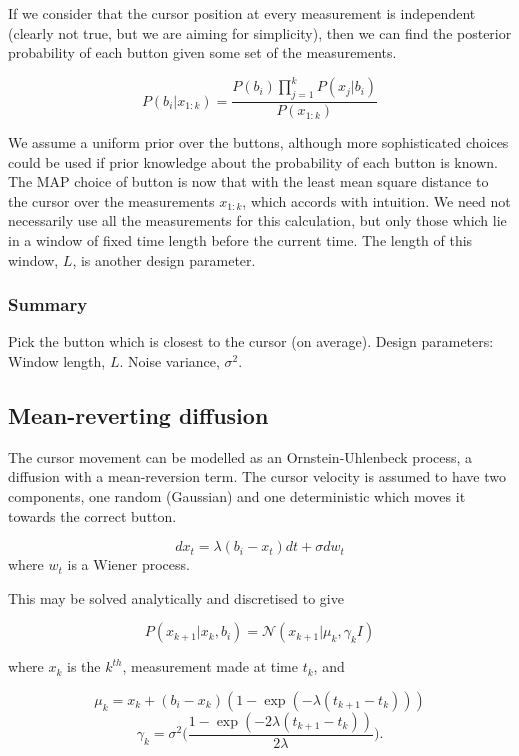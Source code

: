 If we consider that the cursor position at every measurement is independent (clearly not true, but we are aiming for simplicity), then we can find the posterior probability of each button given some set of the measurements.

\begin{equation}
P(b_i|x_{1:k}) = \frac{P(b_i)\prod_{j=1}^{k}{P(x_j| b_i)}}{P(x_{1:k})}
\end{equation}

We assume a uniform prior over the buttons, although more sophisticated choices could be used if prior knowledge about the probability of each button is known. The MAP choice of button is now that with the least mean square distance to the cursor over the measurements $x_{1:k}$, which accords with intuition. We need not necessarily use all the measurements for this calculation, but only those which lie in a window of fixed time length before the current time. The length of this window, $L$, is another design parameter.

\subsubsection*{Summary}
Pick the button which is closest to the cursor (on average).
Design parameters: Window length, $L$. Noise variance, $\sigma^2$.



\subsection{Mean-reverting diffusion}
The cursor movement can be modelled as an Ornstein-Uhlenbeck process, a diffusion with a mean-reversion term. The cursor velocity is assumed to have two components, one random (Gaussian) and one deterministic which moves it towards the correct button.

\begin{equation}dx_t = \lambda (b_i - x_t)dt + \sigma dw_t\end{equation}
where $w_t$ is a Wiener process.

This may be solved analytically and discretised to give

\begin{equation}P(x_{k+1}|x_{k}, b_i) = \mathcal{N} ( x_{k+1} | \mu_k, \gamma_k I)\end{equation}

where $x_k$ is the $k^{th}$, measurement made at time $t_k$, and

\begin{equation}\mu_k = x_{k} + (b_i - x_k) (1-\exp(-\lambda (t_{k+1} - t_k)))\end{equation}
\begin{equation}\gamma_k = \sigma^2 \bigg (\frac{1-\exp(-2 \lambda (t_{k+1} - t_k))}{2 \lambda} \bigg ) .\end{equation}

